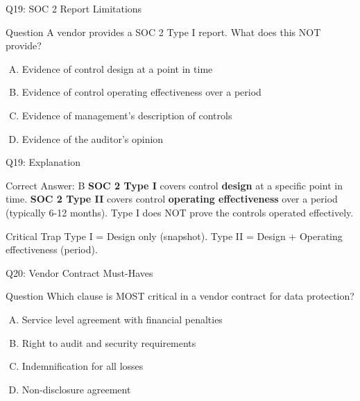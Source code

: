 \documentclass{beamer}
\begin{document}
	\begin{frame}{Q19: SOC 2 Report Limitations}
		\begin{block}{Question}
			A vendor provides a SOC 2 Type I report. What does this NOT provide?
		\end{block}
		\begin{enumerate}[(A)]
			\item Evidence of control design at a point in time
			\item Evidence of control operating effectiveness over a period
			\item Evidence of management's description of controls
			\item Evidence of the auditor's opinion
		\end{enumerate}
	\end{frame}
	
	\begin{frame}{Q19: Explanation}
		\begin{block}{Correct Answer: B}
			\textbf{SOC 2 Type I} covers control \textbf{design} at a specific point in time. \textbf{SOC 2 Type II} covers control \textbf{operating effectiveness} over a period (typically 6-12 months). Type I does NOT prove the controls operated effectively.
		\end{block}
		\begin{alertblock}{Critical Trap}
			Type I = Design only (snapshot).
			Type II = Design + Operating effectiveness (period).
		\end{alertblock}
	\end{frame}
	
	\begin{frame}{Q20: Vendor Contract Must-Haves}
		\begin{block}{Question}
			Which clause is MOST critical in a vendor contract for data protection?
		\end{block}
		\begin{enumerate}[(A)]
			\item Service level agreement with financial penalties
			\item Right to audit and security requirements
			\item Indemnification for all losses
			\item Non-disclosure agreement
		\end{enumerate}
	\end{frame}
	
\end{document}
